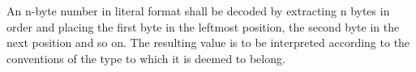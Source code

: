 An n-byte number in literal format shall be decoded by extracting n
bytes in order and placing the first byte in the leftmost position, the
second byte in the next position and so on. The resulting value is to be
interpreted according to the conventions of the type to which it is
deemed to belong.

